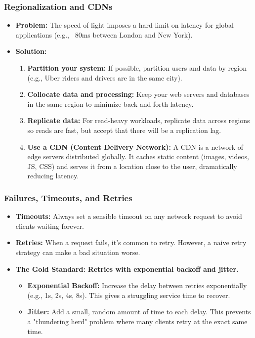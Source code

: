 \documentclass{article}
\begin{document}
\subsubsection{Regionalization and CDNs}
\begin{itemize}
    \item \textbf{Problem:} The speed of light imposes a hard limit on latency for global applications (e.g., ~80ms between London and New York).
    \item \textbf{Solution:}
    \begin{enumerate}
        \item \textbf{Partition your system:} If possible, partition users and data by region (e.g., Uber riders and drivers are in the same city).
        \item \textbf{Collocate data and processing:} Keep your web servers and databases in the same region to minimize back-and-forth latency.
        \item \textbf{Replicate data:} For read-heavy workloads, replicate data across regions so reads are fast, but accept that there will be a replication lag.
        \item \textbf{Use a CDN (Content Delivery Network):} A CDN is a network of edge servers distributed globally. It caches static content (images, videos, JS, CSS) and serves it from a location close to the user, dramatically reducing latency.
    \end{enumerate}
\end{itemize}

\subsubsection{Failures, Timeouts, and Retries}
\begin{itemize}
    \item \textbf{Timeouts:} Always set a sensible timeout on any network request to avoid clients waiting forever.
    \item \textbf{Retries:} When a request fails, it's common to retry. However, a naive retry strategy can make a bad situation worse.
    \item \textbf{The Gold Standard:} \textbf{Retries with exponential backoff and jitter.}\ 
    \begin{itemize}
        \item \textbf{Exponential Backoff:} Increase the delay between retries exponentially (e.g., 1s, 2s, 4s, 8s). This gives a struggling service time to recover.
        \item \textbf{Jitter:} Add a small, random amount of time to each delay. This prevents a "thundering herd" problem where many clients retry at the exact same time.
    \end{itemize}
\end{itemize}
\end{document}
